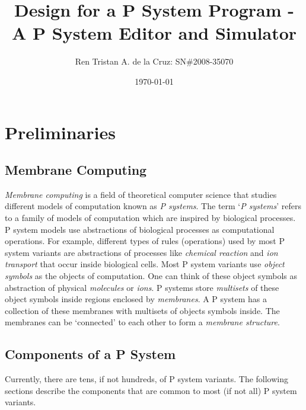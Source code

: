 \documentclass{article}
\title{Design for a P System Program - A P System Editor and Simulator}
\date{\today}
\author{Ren Tristan A. de la Cruz: SN\#2008-35070}
\begin{document}
\maketitle


\section{Preliminaries}



\subsection{Membrane Computing}\label{s-memcom}


\textit{Membrane computing} is a field of theoretical computer science that studies different models
of computation known as \textit{P systems}. The term `\textit{P systems}' refers to a family of
models of computation which are inspired by biological processes. P system models use abstractions
of biological processes as computational operations. For example, different types of rules
(operations) used by most P system variants are abstractions of processes like \textit{chemical
reaction} and \textit{ion transport} that occur inside biological cells. Most P system variants use 
\textit{object symbols} as the objects of computation. One can think of these object symbols as 
abstraction of physical \textit{molecules} or \textit{ions}. P systems store \textit{multisets} of
these object symbols inside regions enclosed by \textit{membranes}. A P system has a collection of
these membranes with multisets of objects symbols inside. The membranes can be `connected' to each
other to form a \textit{membrane structure}.


\subsection{Components of a P System}\label{s-psystem}

Currently, there are tens, if not hundreds, of P system variants. The following sections describe 
the components that are common to most (if not all) P system variants.
\end{document}
